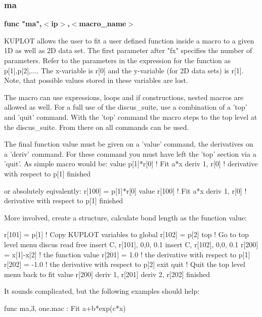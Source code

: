 \subsubsection{ma}
{\bf func "ma",$ <$ip$> $,$ <$macro\_name$> $ \par }
\vspace{3pt}
KUPLOT allows the user to fit a user defined function inside a 
macro to a given 1D as well as 2D data set. The first parameter 
after "fx" specifies the number of parameters. Refer to the 
parameters in the expression for the function as p[1],p[2],.... 
The x-variable is r[0] and the y-variable (for 2D data sets) 
is r[1]. Note, that possible values stored in these variables 
are lost. 
\par
The macro can use expressions, loops and if constructions, 
nested macros are allowed as well. 
For a full use of the discus\_suite, use a combination of a 
'top' and 'quit' command. With the 'top' command the macro 
steps to the top level at the discus\_suite. From there on 
all commands can be used. 
\par
The final function value must be given on a 'value' command, 
the derivatives on a 'deriv' command. For these command you 
must have left the 'top' section via a 'quit'. 
As simple macro would be: 
value p[1]*r[0]                  ! Fit a*x 
deriv 1, r[0]                    ! derivative with respect to p[1] 
finished 
\par
or absolutely eqivalently: 
r[100] = p[1]*r[0] 
value r[100]                     ! Fit a*x 
deriv 1, r[0]                    ! derivative with respect to p[1] 
finished 
\par
More involved, create a structure, calculate bond length as the 
function value: 
\par
r[101] = p[1]                    ! Copy KUPLOT variables to global 
r[102] = p[2] 
top                              ! Go to top level menu 
  discus 
    read 
      free 
    insert C, r[101], 0,0, 0.1 
    insert C, r[102], 0,0, 0.1 
    r[200] = x[1]-x[2]           ! the function value 
    r[201] =  1.0                ! the derivative with respect to p[1] 
    r[202] = -1.0                ! the derivative with respect to p[2] 
  exit 
quit                             ! Quit the top level menu back to fit 
value r[200] 
deriv 1, r[201] 
deriv 2, r[202] 
finished 
\par
It sounds complicated, but the following examples should help: 
\par
\begin{MacVerbatim}
func ma,3, one.mac                   : Fit a+b*exp(c*x)
\end{MacVerbatim}
